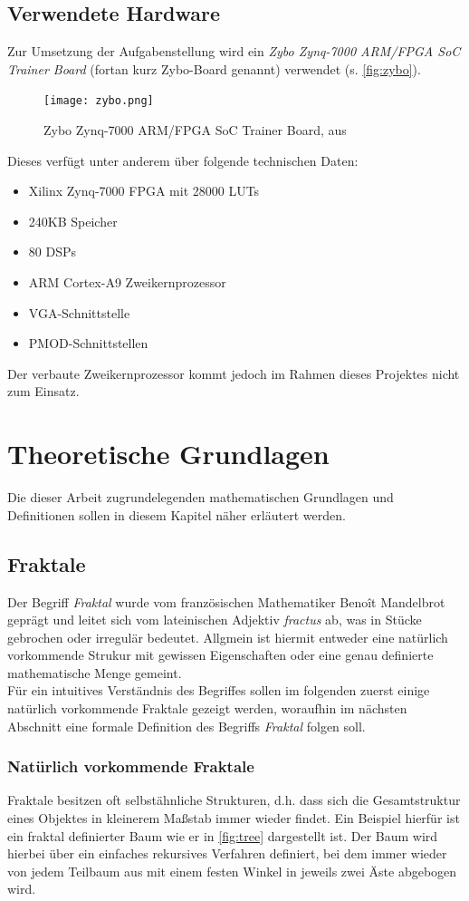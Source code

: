 \documentclass[a4paper,12pt,onesided]{report}
\begin{document}
\section{Verwendete Hardware}
Zur Umsetzung der Aufgabenstellung wird ein \textit{Zybo Zynq-7000 ARM/FPGA SoC Trainer Board} (fortan kurz Zybo-Board genannt) verwendet (s. \autoref{fig:zybo}).
\begin{figure}[H]
	\centering
	\texttt{[image: zybo.png]}
	\caption{Zybo Zynq-7000 ARM/FPGA SoC Trainer Board, aus }
	\label{fig:zybo}
\end{figure}
Dieses verfügt unter anderem über folgende technischen Daten:
\begin{itemize}
	\item Xilinx Zynq-7000 FPGA mit 28000 LUTs
	\item 240KB Speicher
	\item 80 DSPs
	\item ARM Cortex-A9 Zweikernprozessor
	\item VGA-Schnittstelle
	\item PMOD-Schnittstellen
\end{itemize}
Der verbaute Zweikernprozessor kommt jedoch im Rahmen dieses Projektes nicht zum Einsatz.

\chapter{Theoretische Grundlagen}
Die dieser Arbeit zugrundelegenden mathematischen Grundlagen und Definitionen sollen in diesem Kapitel näher erläutert werden.

\section{Fraktale}
Der Begriff \textit{Fraktal} wurde vom französischen Mathematiker Benoît Mandelbrot geprägt und leitet sich vom lateinischen Adjektiv \textit{fractus} ab, was \glqq in Stücke gebrochen\grqq{} oder \glqq irregulär\grqq{} bedeutet. Allgmein ist hiermit entweder eine natürlich vorkommende Strukur mit gewissen Eigenschaften oder eine genau definierte mathematische Menge gemeint. \cite[S. 16]{mandelbrot2013fraktale}\\
Für ein intuitives Verständnis des Begriffes sollen im folgenden zuerst einige natürlich vorkommende Fraktale gezeigt werden, woraufhin im nächsten Abschnitt eine formale Definition des Begriffs \textit{Fraktal} folgen soll.

\subsection{Natürlich vorkommende Fraktale}
\label{sec:natfrac}
Fraktale besitzen oft selbstähnliche Strukturen, d.h. dass sich die Gesamtstruktur eines Objektes in kleinerem Maßstab immer wieder findet. Ein Beispiel hierfür ist ein fraktal definierter Baum wie er in \autoref{fig:tree} dargestellt ist. Der Baum wird hierbei über ein einfaches rekursives Verfahren definiert, bei dem immer wieder von jedem Teilbaum aus mit einem festen Winkel in jeweils zwei Äste abgebogen wird.
\end{document}
